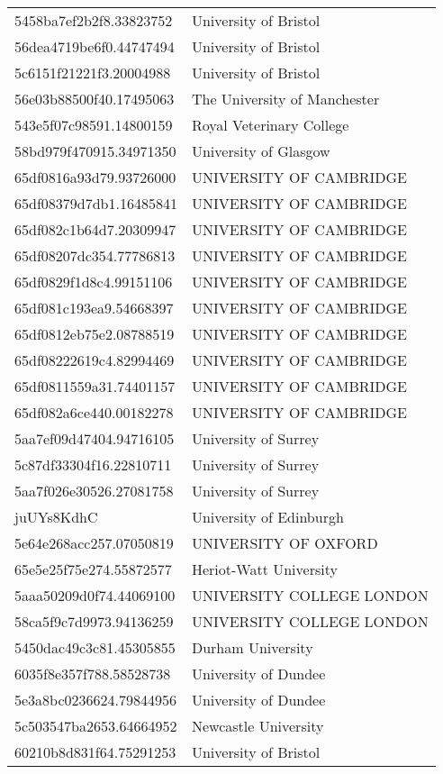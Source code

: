\begin{tabular}{ll}
5458ba7ef2b2f8.33823752 & University of Bristol \\
56dea4719be6f0.44747494 & University of Bristol \\
5c6151f21221f3.20004988 & University of Bristol \\
56e03b88500f40.17495063 & The University of Manchester \\
543e5f07c98591.14800159 & Royal Veterinary College \\
58bd979f470915.34971350 & University of Glasgow \\
65df0816a93d79.93726000 & UNIVERSITY OF CAMBRIDGE \\
65df08379d7db1.16485841 & UNIVERSITY OF CAMBRIDGE \\
65df082c1b64d7.20309947 & UNIVERSITY OF CAMBRIDGE \\
65df08207dc354.77786813 & UNIVERSITY OF CAMBRIDGE \\
65df0829f1d8c4.99151106 & UNIVERSITY OF CAMBRIDGE \\
65df081c193ea9.54668397 & UNIVERSITY OF CAMBRIDGE \\
65df0812eb75e2.08788519 & UNIVERSITY OF CAMBRIDGE \\
65df08222619c4.82994469 & UNIVERSITY OF CAMBRIDGE \\
65df0811559a31.74401157 & UNIVERSITY OF CAMBRIDGE \\
65df082a6ce440.00182278 & UNIVERSITY OF CAMBRIDGE \\
5aa7ef09d47404.94716105 & University of Surrey \\
5c87df33304f16.22810711 & University of Surrey \\
5aa7f026e30526.27081758 & University of Surrey \\
juUYs8KdhC & University of Edinburgh \\
5e64e268acc257.07050819 & UNIVERSITY OF OXFORD \\
65e5e25f75e274.55872577 & Heriot-Watt University \\
5aaa50209d0f74.44069100 & UNIVERSITY COLLEGE LONDON \\
58ca5f9c7d9973.94136259 & UNIVERSITY COLLEGE LONDON \\
5450dac49c3c81.45305855 & Durham University \\
6035f8e357f788.58528738 & University of Dundee \\
5e3a8bc0236624.79844956 & University of Dundee \\
5c503547ba2653.64664952 & Newcastle University \\
60210b8d831f64.75291253 & University of Bristol \\

\end{tabular}
